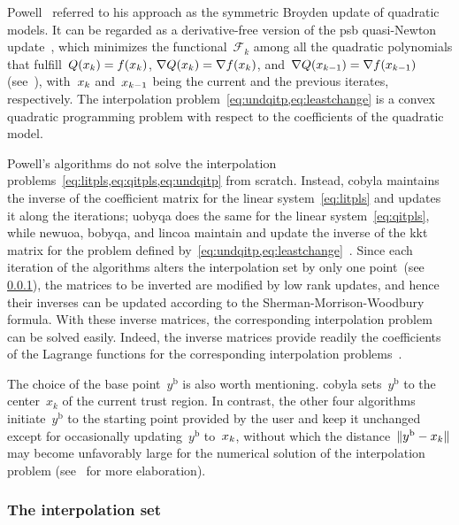 \documentclass[11pt,draft]{article}
\numberwithin{equation}{section}
\newcommand{\base}{{\text{b}}}
\newcommand{\func}{\mathcal{F}}
\newcommand{\iter}[1][k]{x\ifthenelse{\equal{#1}{}}{}{_{#1}}}
\newcommand{\obj}{f}
\begin{document}
Powell~\cite{Powell_2013} referred to his approach as the symmetric Broyden update of quadratic models.
It can be regarded as a derivative-free version of the \gls{psb} quasi-Newton update~\cite{Powell_1970b}, which minimizes the functional~$\func_k$ among all the quadratic polynomials that fulfill~$Q(\iter) = \obj(\iter)$, $\nabla Q(\iter)
= \nabla \obj(\iter)$, and~$\nabla Q(\iter[k - 1]) = \nabla \obj(\iter[k - 1])$ (see~\cite[Theorem~4.2]{Dennis_Schnabel_1979}), with~$\iter$ and~$\iter[k - 1]$ being the current and the previous iterates, respectively.
The interpolation problem~\cref{eq:undqitp,eq:leastchange} is a convex quadratic programming problem with respect to the coefficients of the quadratic model.

Powell's algorithms do not solve the interpolation problems~\cref{eq:litpls,eq:qitpls,eq:undqitp} from scratch.
Instead, \gls{cobyla} maintains the inverse of the coefficient matrix for the linear system~\cref{eq:litpls} and updates it along the iterations; \gls{uobyqa} does the same for the linear system~\cref{eq:qitpls}, while \gls{newuoa},
\gls{bobyqa}, and \gls{lincoa} maintain and update the inverse of the \gls{kkt} matrix
for the problem defined by~\cref{eq:undqitp,eq:leastchange}~\cite{Powell_2004b}.
Since each iteration of the algorithms alters the interpolation set by only one point~(see \cref{ssec:iptset}), the matrices to be inverted are modified by low rank updates, and hence their inverses can be updated according to the
Sherman-Morrison-Woodbury formula.
With these inverse matrices, the corresponding interpolation problem can be solved easily.
Indeed, the inverse matrices provide readily the coefficients of the Lagrange functions for the corresponding interpolation problems~\cite{Powell_2001,Powell_2004a}.

The choice of the base point~$y^{\base}$ is also worth mentioning.
\Gls{cobyla} sets~$y^{\base}$ to the center~$x_k$ of the current trust region.
In contrast, the other four algorithms initiate~$y^{\base}$ to the starting point provided by the user and keep it unchanged except for occasionally updating~$y^{\base}$ to~$\iter$, without which the distance~$\|y^{\base}-\iter\|$ may become unfavorably large for the numerical solution of the interpolation problem (see~\cite[\S~5]{Powell_2004a} for more elaboration).

\subsubsection{The interpolation set}
\label{ssec:iptset}
\end{document}
